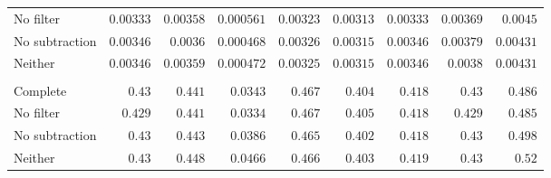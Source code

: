 \begin{longtable}{@{}lrrrrrrrr@{}}
No filter & $0.00333$ & $0.00358$ & $0.000561$ & $0.00323$ & $0.00313$ & $0.00333$ & $0.00369$ & $0.0045$ \\
No subtraction & $0.00346$ & $0.0036$ & $0.000468$ & $0.00326$ & $0.00315$ & $0.00346$ & $0.00379$ & $0.00431$ \\
Neither & $0.00346$ & $0.00359$ & $0.000472$ & $0.00325$ & $0.00315$ & $0.00346$ & $0.0038$ & $0.00431$ \\
\addlinespace[4pt]\multicolumn{9}{l}{\textit{Kolmogorov}}\\*
Complete & $0.43$ & $0.441$ & $0.0343$ & $0.467$ & $0.404$ & $0.418$ & $0.43$ & $0.486$ \\
No filter & $0.429$ & $0.441$ & $0.0334$ & $0.467$ & $0.405$ & $0.418$ & $0.429$ & $0.485$ \\
No subtraction & $0.43$ & $0.443$ & $0.0386$ & $0.465$ & $0.402$ & $0.418$ & $0.43$ & $0.498$ \\
Neither & $0.43$ & $0.448$ & $0.0466$ & $0.466$ & $0.403$ & $0.419$ & $0.43$ & $0.52$ \\
\end{longtable}
\endgroup
